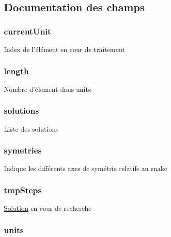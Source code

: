 \subsection{Documentation des champs}
\hypertarget{struct_snake_a1e5f8a70f50d68340f54ac884c05dcff}{
\subsubsection[{current\-Unit}]{\setlength{\rightskip}{0pt plus 5cm}current\-Unit}}\label{struct_snake_a1e5f8a70f50d68340f54ac884c05dcff}
Index de l'élément en cour de traitement \hypertarget{struct_snake_af9d495c1655d813d553030485d00fea7}{
\subsubsection[{length}]{\setlength{\rightskip}{0pt plus 5cm}length}}\label{struct_snake_af9d495c1655d813d553030485d00fea7}
Nombre d'élement dans units \hypertarget{struct_snake_a97be9d71c3998b7a3a97e9403e375979}{
\subsubsection[{solutions}]{\setlength{\rightskip}{0pt plus 5cm}solutions}}\label{struct_snake_a97be9d71c3998b7a3a97e9403e375979}
Liste des solutions \hypertarget{struct_snake_af0fd2b78c237d732b558aa24f3a1d68c}{
\subsubsection[{symetries}]{\setlength{\rightskip}{0pt plus 5cm}symetries}}\label{struct_snake_af0fd2b78c237d732b558aa24f3a1d68c}
Indique les différents axes de symétrie relatifs au snake \hypertarget{struct_snake_a99a4f4239fb1568fe35d9a081c9b2660}{
\subsubsection[{tmp\-Steps}]{\setlength{\rightskip}{0pt plus 5cm}tmp\-Steps}}\label{struct_snake_a99a4f4239fb1568fe35d9a081c9b2660}
\hyperlink{struct_solution}{Solution} en cour de recherche \hypertarget{struct_snake_a2ff02817760e56a95b3b1bc7cfa1b77b}{
\subsubsection[{units}]{\setlength{\rightskip}{0pt plus 5cm}units}}\label{struct_snake_a2ff02817760e56a95b3b1bc7cfa1b77b}
